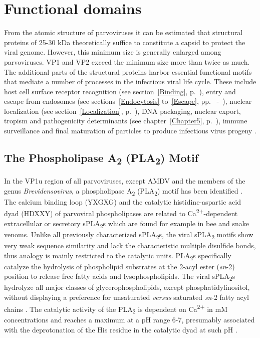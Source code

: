 \section{Functional domains}
\label{Motif}

From the atomic structure of parvoviruses it can be estimated that structural proteins of 25-30 kDa theoretically suffice to constitute a capsid to protect the viral genome. However, this minimum size is generally enlarged among parvoviruses. VP1 and VP2 exceed the minimum size more than twice as much. The additional parts of the structural proteins harbor essential functional motifs that mediate a number of processes in the infectious viral life cycle. These include host cell surface receptor recognition (see section~\ref{Binding}, p.~\pageref{Binding}), entry and escape from endosomes (see sections~\ref{Endocytosis} to~\ref{Escape}, pp.~\pageref{Endocytosis} -~\pageref{Escape}), nuclear localization (see section~\ref{Localization}, p.~\pageref{Localization}), DNA packaging, nuclear export, tropism and pathogenicity determinants (see chapter~\ref{Chapter5}, p.~\pageref{Chapter5}), immune surveillance and final maturation of particles to produce infectious virus progeny \cite{PLA2}.    

\subsection{The Phospholipase A\textsubscript{2} (PLA\textsubscript{2}) Motif}
\label{PLA2}

In the VP1u region of all parvoviruses, except AMDV and the members of the genus \textit{Brevidensovirus}, a phospholipase A\textsubscript{2} (PLA\textsubscript{2}) motif has been identified \cite{pmid11702787}. The calcium binding loop (YXGXG) and the catalytic histidine-aspartic acid dyad (HDXXY) of parvoviral phospholipases are related to Ca\textsuperscript{2+}-dependent extracellular or secretory sPLA\textsubscript{2}s which are found for example in bee and snake venoms. Unlike all previously characterized sPLA\textsubscript{2}s, the viral sPLA\textsubscript{2} motifs show very weak sequence similarity and lack the characteristic multiple disulfide bonds, thus analogy is mainly restricted to the catalytic units. PLA\textsubscript{2}s specifically catalyze the hydrolysis of phospholipid substrates at the 2-acyl ester (\textit{sn}-2) position to release free fatty acids and lysophospholipids. The viral sPLA\textsubscript{2}s hydrolyze all major classes of glycerophospholipids, except phosphatidylinositol, without displaying a preference for unsaturated \textit{versus} saturated \textit{sn}-2 fatty acyl chains \cite{pmid14726513}. The catalytic activity of the PLA\textsubscript{2} is dependent on Ca\textsuperscript{2+} in mM concentrations and reaches a maximum at a pH range 6-7, presumably associated with the deprotonation of the His residue in the catalytic dyad at such pH \cite{pmid9115999, pmid7574497}.

